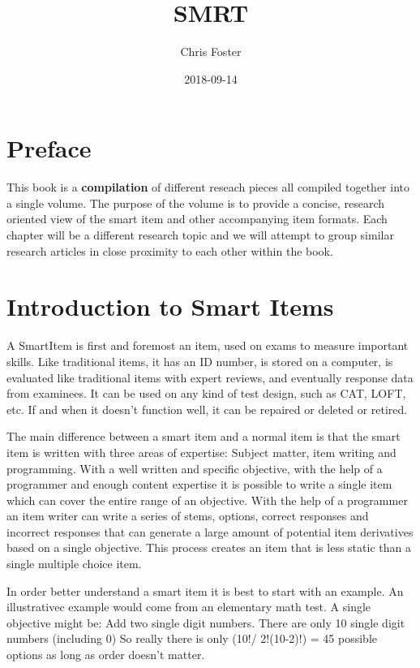 \documentclass[]{book}
\title{SMRT}
\author{Chris Foster}
\date{2018-09-14}
\theoremstyle{definition}
\theoremstyle{definition}
\theoremstyle{definition}
\theoremstyle{remark}
\begin{document}
\maketitle

{
\setcounter{tocdepth}{1}
\tableofcontents
}
\chapter{Preface}\label{preface}

This book is a \textbf{compilation} of different reseach pieces all
compiled together into a single volume. The purpose of the volume is to
provide a concise, research oriented view of the smart item and other
accompanying item formats. Each chapter will be a different research
topic and we will attempt to group similar research articles in close
proximity to each other within the book.

\chapter{Introduction to Smart Items}\label{introduction-to-smart-items}

A SmartItem is first and foremost an item, used on exams to measure
important skills. Like traditional items, it has an ID number, is stored
on a computer, is evaluated like traditional items with expert reviews,
and eventually response data from examinees. It can be used on any kind
of test design, such as CAT, LOFT, etc. If and when it doesn't function
well, it can be repaired or deleted or retired.

The main difference between a smart item and a normal item is that the
smart item is written with three areas of expertise: Subject matter,
item writing and programming. With a well written and specific
objective, with the help of a programmer and enough content expertise it
is possible to write a single item which can cover the entire range of
an objective. With the help of a programmer an item writer can write a
series of stems, options, correct responses and incorrect responses that
can generate a large amount of potential item derivatives based on a
single objective. This process creates an item that is less static than
a single multiple choice item.

In order better understand a smart item it is best to start with an
example. An illustrativec example would come from an elementary math
test. A single objective might be: Add two single digit numbers. There
are only 10 single digit numbers (including 0) So really there is only
(10!/ 2!(10-2)!) = 45 possible options as long as order doesn't matter.
\end{document}
